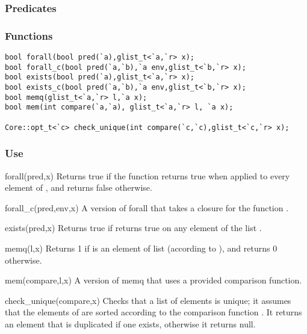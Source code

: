 \subsubsection*{Predicates}
\subsubsection*{Functions}
\begin{verbatim}
bool forall(bool pred(`a),glist_t<`a,`r> x);
bool forall_c(bool pred(`a,`b),`a env,glist_t<`b,`r> x);
bool exists(bool pred(`a),glist_t<`a,`r> x);
bool exists_c(bool pred(`a,`b),`a env,glist_t<`b,`r> x);
bool memq(glist_t<`a,`r> l,`a x);
bool mem(int compare(`a,`a), glist_t<`a,`r> l, `a x);

Core::opt_t<`c> check_unique(int compare(`c,`c),glist_t<`c,`r> x);
\end{verbatim}

\subsubsection*{Use}

\begin{defun}{forall}{(pred,x)}
Returns true if the function  returns true when applied to
every element of , and returns false otherwise.
\end{defun}

\begin{defun}{forall_c}{(pred,env,x)}
A version of forall that takes a closure for the function .
\end{defun}

\begin{defun}{exists}{(pred,x)}
Returns true if  returns true on any element of the list
.
\end{defun}

\begin{defun}{memq}{(l,x)}
Returns 1 if  is an element of list  (according to
\code{==}), and returns 0 otherwise.
\end{defun}

\begin{defun}{mem}{(compare,l,x)}
A version of memq that uses a provided comparison function.
\end{defun}

\begin{defun}{check_unique}{(compare,x)}
Checks that a list of elements is unique; it assumes that the elements
of  are sorted according to the comparison function
.  It returns an element that is duplicated if one exists,
otherwise it returns null.
\end{defun}

